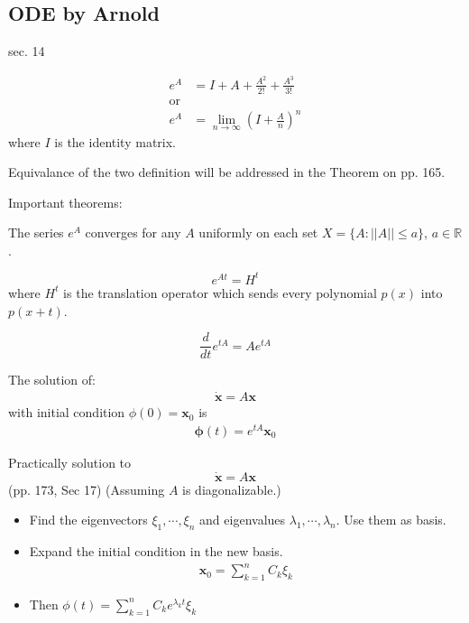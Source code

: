 \subsection{ODE by Arnold}
sec. 14
\begin{defi}
   	\begin{align}
   	\label{eq:e^A}
   	e^A &= I + A + \frac{A^2}{2!} + \frac{A^3}{3!}\\
   	\text{or}& \nonumber \\
   	e^A &= \lim_{n\to \infty}(I+\frac{A}{n})^n
   	\end{align}
   	where $I$ is the identity matrix.
\end{defi}
Equivalance of the two definition will be addressed in the Theorem on
pp. 165.

Important theorems:
\begin{thm}[pp. 158]
   	The series $e^A$ converges for any $A$ uniformly on each set
   	$X=\{A:||A||\leq a\}$, $a\in \mathbb{R}$.
\end{thm}
\begin{thm}[pp. 160]
   	$$e^{At} = H^t$$
   	where $H^t$ is the translation operator which sends every polynomial
   	$p(x)$ into $p(x+t)$.
\end{thm}
\begin{thm}[pp. 163]
   	$$\frac{d}{dt} e^{tA} = Ae^{tA}$$
\end{thm}
\begin{thm}
   	The solution of:
   	\begin{align}
   	\label{eq:fund_thm_of_linear_eqs_const_coef}
   	\dot{\mathbf{x}} = A\mathbf{x}
   	\end{align}
   	with initial condition $\phi(0) = \mathbf{x}_0$ is
   	\begin{align}
   	\mathbf{\phi}(t) = e^{tA}\mathbf{x}_0
   	\end{align}
\end{thm}

Practically solution to
$$ \dot{\mathbf{x}} = A\mathbf{x}$$
(pp. 173, Sec 17)
(Assuming $A$ is diagonalizable.)
\begin{itemize}
   	\item Find the eigenvectors $\xi_1,\cdots ,\xi_n$ and eigenvalues
   	$\lambda_1,\cdots ,\lambda_n$. Use them as basis.
   	\item Expand the initial condition in the new basis.
   	\begin{align}
   	\mathbf{x}_0=\sum_{k=1}^{n} C_k\xi_k
   	\end{align}
   	\item Then $\phi(t) = \sum_{k=1}^n C_k e^{\lambda_k t}\xi_k$
\end{itemize}

